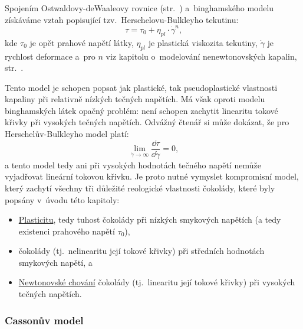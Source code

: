 \documentclass[12pt]{article}
\begin{document}
Spojením Ostwaldovy-deWaaleovy rovnice (str.~\pageref{eq:ostwald_dewaale}) a~binghamského modelu získáváme vztah popisující tzv.~Herschelovu-Bulkleyho tekutinu:~\cite{Article:Comparison_of_models_chocolate}\cite{Article:Extended_casson_equation}
\begin{equation}
    \tau = \tau_0 + \eta_{pl}\cdot\dot\gamma^n\text{,}
\end{equation}
kde $\tau_0$ je opět prahové napětí látky, $\eta_{pl}$ je plastická viskozita tekutiny, $\dot\gamma$ je rychlost deformace a~pro $n$ viz kapitolu o~modelování nenewtonovských kapalin, str.~\pageref{eq:ostwald_dewaale}.
\par\noindent
Tento model je schopen popsat jak plastické, tak pseudoplastické vlastnosti kapaliny při relativně nízkých tečných napětích. Má však oproti modelu binghamských látek opačný problém: není schopen zachytit linearitu tokové křivky při vysokých tečných napětích. Odvážný čtenář si může dokázat, že pro Herschelův-Bulkleyho model platí:
\begin{equation}
    \lim_{\dot\gamma\to\infty} \frac{\dd\tau}{\dd\dot\gamma} = 0\text{,}
\end{equation}
a tento model tedy ani při vysokých hodnotách tečného napětí nemůže vyjadřovat lineární tokovou křivku. Je proto nutné vymyslet kompromisní model, který zachytí všechny tři důležité reologické vlastnosti čokolády, které byly popsány v~úvodu této kapitoly:
\begin{itemize}[noitemsep, topsep = 0pt]
    \item \underline{Plasticitu}, tedy tuhost čokolády při nízkých smykových napětích (a tedy existenci prahového napětí $\tau_0$),
    \item \underline{} čokolády (tj.~nelinearitu její tokové křivky) při středních hodnotách smykových napětí, a~    \item \underline{Newtonovské chování} čokolády (tj.~linearitu její tokové křivky) při vysokých tečných napětích.
\end{itemize}

\subsubsection{Cassonův model}%
\label{sec:Casson}
\end{document}
